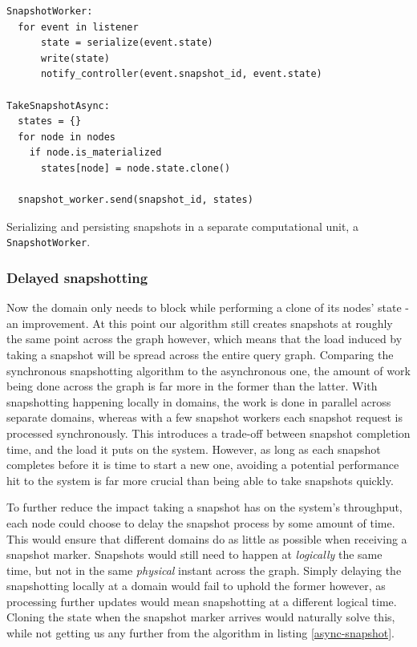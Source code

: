 \documentclass[b5paper]{report}
\begin{document}
\begin{listing}[H]
  \begin{verbatim}
SnapshotWorker:
  for event in listener
      state = serialize(event.state)
      write(state)
      notify_controller(event.snapshot_id, event.state)

TakeSnapshotAsync:
  states = {}
  for node in nodes
    if node.is_materialized
      states[node] = node.state.clone()

  snapshot_worker.send(snapshot_id, states)
  \end{verbatim}
  \caption{
    Serializing and persisting snapshots in a separate computational unit, a
    \texttt{SnapshotWorker}.
    \label{async-snapshot}
  }
\end{listing}

\subsubsection{Delayed snapshotting} \label{sec:delay-snapshot}
Now the domain only needs to block while performing a clone of its nodes' state
- an improvement. At this point our algorithm still creates snapshots at roughly
the same point across the graph however, which means that the load induced by
taking a snapshot will be spread across the entire query graph. Comparing the
synchronous snapshotting algorithm to the asynchronous one, the amount of work
being done across the graph is far more in the former than the latter. With
snapshotting happening locally in domains, the work is done in parallel across
separate domains, whereas with a few snapshot workers each snapshot request is
processed synchronously. This introduces a trade-off between snapshot completion
time, and the load it puts on the system. However, as long as each snapshot completes
before it is time to start a new one, avoiding a potential performance hit to
the system is far more crucial than being able to take snapshots quickly.

To further reduce the impact taking a snapshot has on the system's throughput,
each node could choose to delay the snapshot process by some amount of time.
This would ensure that different domains do as little as possible when receiving
a snapshot marker. Snapshots would still need to happen at \textit{logically} the same
time, but not in the same \textit{physical} instant across the graph. Simply
delaying the snapshotting locally at a domain would fail to uphold the former
however, as processing further updates would mean snapshotting at a different
logical time. Cloning the state when the snapshot marker arrives would naturally
solve this, while not getting us any further from the algorithm in listing
\ref{async-snapshot}.
\end{document}

